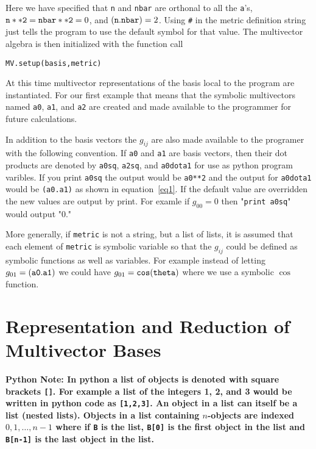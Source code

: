 \documentclass{article}
\begin{document}
Here we have specified that {\tt n} and {\tt nbar} are orthonal to all the {\tt a}'s,
${\tt n**2} = {\tt nbar**2} = 0$, and ${\tt (n.nbar)} = 2$. Using {\tt \#} in the metric
definition string just tells the program to use the default symbol for that value.  The multivector
algebra is then initialized with the function call

{\tt MV.setup(basis,metric)}

At this time multivector representations of the basis local to the program are instantiated.  For our
first example that means that the symbolic multivectors named {\tt a0}, {\tt a1}, and {\tt a2} are
created and made available to the programmer for future calculations.

In addition to the basis vectors the $g_{ij}$ are also made available to the programer with the following
convention. If {\tt a0} and {\tt a1} are basis vectors, then their dot products are denoted by 
{\tt a0sq}, {\tt a2sq}, and {\tt a0dota1} for use as python program varibles. If you print 
{\tt a0sq} the output would be {\tt a0**2} and the output for {\tt a0dota1} would be {\tt (a0.a1)} as
shown in equation~\ref{eq1}.  If the default value are overridden the new values are output by print.  For
examle if $g_{00} = 0$ then "{\tt print a0sq}" would output "0."


More generally, if {\tt metric} is not a string, but a list of lists, it is assumed that each element
of {\tt metric} is symbolic variable so that the $g_{ij}$ could be defined as symbolic functions as well
as variables. For example instead of letting $g_{01} = {\tt (a0.a1)}$ we could have 
$g_{01} = {\tt cos(theta)}$ where we use a symbolic $\cos$ function.

\section{Representation and Reduction of Multivector Bases}

{\bf Python Note: In python a list of objects is denoted with square brackets {\tt []}. For example a list
of the integers 1, 2, and 3 would be written in python code as {\tt [1,2,3]}. An object in a list can itself
be a list (nested lists).  Objects in a list containing $n$-objects are indexed $0,1,\dots,n-1$ where if
{\tt B} is the list, {\tt B[0]} is the first object in the list and {\tt B[n-1]} is the last object in the list.}
\end{document}

